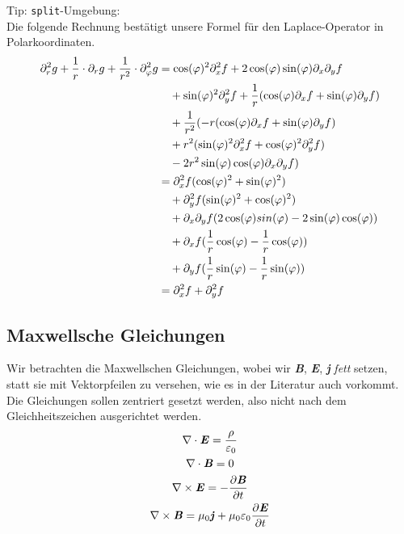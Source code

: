 \documentclass{article}
\begin{document}
Tip: \texttt{split}-Umgebung: \\
Die folgende Rechnung bestätigt unsere Formel für den Laplace-Operator in Polarkoordinaten.
%
\begin{equation}
\begin{split}
    \partial_{r}^{2}g + {1 \over r} \cdot \partial_r g + {1 \over r^2} \cdot \partial_{\varphi}^{2}g & = \cos(\varphi)^2\partial_{x}^{2}f + 2\cos(\varphi)\sin(\varphi)\partial_x \partial_y f \\
    & \quad +\sin(\varphi)^2 \partial_{y}^{2} f + {1 \over r} (\cos(\varphi) \partial_x f + \sin(\varphi) \partial_y f) \\
    & \quad + {1 \over r^2} (-r(\cos(\varphi) \partial_x f + \sin(\varphi) \partial_y f) \\
    & \quad + r^2 (\sin(\varphi)^2 \partial_{x}^{2} f + \cos(\varphi)^2 \partial_{y}^{2} f) \\
    & \quad - 2r^2 \sin(\varphi) \cos(\varphi) \partial_x \partial_y f) \\
    & = \partial_{x}^{2} f ( \cos(\varphi)^2 + \sin(\varphi)^2) \\
    & \quad + \partial_{y}^{2} f (\sin(\varphi)^2 + \cos(\varphi)^2) \\
    & \quad + \partial_x \partial_y f (2\cos(\varphi)sin(\varphi) - 2\sin(\varphi)\cos(\varphi)) \\
    & \quad + \partial_x f ({1 \over r} \cos(\varphi) - {1 \over r}\cos(\varphi)) \\
    & \quad + \partial_y f ({1 \over r} \sin(\varphi) - {1 \over r}\sin(\varphi)) \\
    & = \partial_{x}^{2} f + \partial_{y}^{2} f
\end{split}
\end{equation}
%
\subsection{Maxwellsche Gleichungen}

Wir betrachten die Maxwellschen Gleichungen, wobei wir \textbf{\textit{B}}, \textbf{\textit{E}}, \textbf{\textit{j}} \textit{fett} setzen,
statt sie mit Vektorpfeilen zu versehen, wie es in der Literatur auch vorkommt.
Die Gleichungen sollen zentriert gesetzt werden, also nicht nach dem Gleichheitszeichen ausgerichtet werden.
%
\begin{gather*}
    \nabla \cdot \textbf{\textit{E}} = {\rho \over \varepsilon_0} \\
    \nabla \cdot \textbf{\textit{B}} = 0 \\
    \nabla \times \textbf{\textit{E}} = - {\partial \textbf{\textit{B}} \over \partial t} \\
    \nabla \times \textbf{\textit{B}} = \mu_0 \textbf{\textit{j}} + \mu_0 \varepsilon_0 {\partial \textbf{\textit{E}} \over \partial t}
\end{gather*}
%
\end{document}
